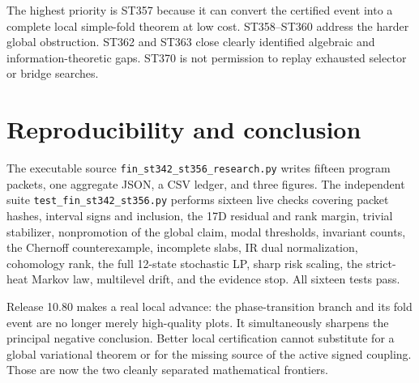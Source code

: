 \documentclass[11pt,a4paper]{article}
\begin{document}
The highest priority is ST357 because it can convert the certified event into a complete
local simple-fold theorem at low cost. ST358--ST360 address the harder global obstruction.
ST362 and ST363 close clearly identified algebraic and information-theoretic gaps. ST370 is
not permission to replay exhausted selector or bridge searches.

\section{Reproducibility and conclusion}

The executable source \texttt{fin\_st342\_st356\_research.py} writes fifteen program
packets, one aggregate JSON, a CSV ledger, and three figures. The independent suite
\texttt{test\_fin\_st342\_st356.py} performs sixteen live checks covering packet hashes,
interval signs and inclusion, the 17D residual and rank margin, trivial stabilizer,
nonpromotion of the global claim, modal thresholds, invariant counts, the Chernoff
counterexample, incomplete slabs, IR dual normalization, cohomology rank, the full
12-state stochastic LP, sharp risk scaling, the strict-heat Markov law, multilevel drift,
and the evidence stop. All sixteen tests pass.

Release 10.80 makes a real local advance: the phase-transition branch and its fold event
are no longer merely high-quality plots. It simultaneously sharpens the principal negative
conclusion. Better local certification cannot substitute for a global variational theorem
or for the missing source of the active signed coupling. Those are now the two cleanly
separated mathematical frontiers.
\end{document}
